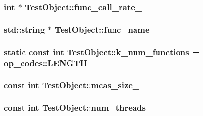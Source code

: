 \subsubsection[{func\+\_\+call\+\_\+rate\+\_\+}]{\setlength{\rightskip}{0pt plus 5cm}int $\ast$ Test\+Object\+::func\+\_\+call\+\_\+rate\+\_\+}\label{class_test_object_ad069dbfc17e738bda7f5ef0a976aab30}
\hypertarget{class_test_object_a0824981875a52434332860af996f4ffb}{}
\subsubsection[{func\+\_\+name\+\_\+}]{\setlength{\rightskip}{0pt plus 5cm}std\+::string $\ast$ Test\+Object\+::func\+\_\+name\+\_\+}\label{class_test_object_a0824981875a52434332860af996f4ffb}
\hypertarget{class_test_object_a2eafe110f35fcae7fa739cd52f02392a}{}
\subsubsection[{k\+\_\+num\+\_\+functions}]{\setlength{\rightskip}{0pt plus 5cm}static const int Test\+Object\+::k\+\_\+num\+\_\+functions = op\+\_\+codes\+::\+L\+E\+N\+G\+T\+H\hspace{0.3cm}{\ttfamily [static]}}\label{class_test_object_a2eafe110f35fcae7fa739cd52f02392a}
\hypertarget{class_test_object_aafa8d7cb90fc81d821f1788af2959ac6}{}
\subsubsection[{mcas\+\_\+size\+\_\+}]{\setlength{\rightskip}{0pt plus 5cm}const int Test\+Object\+::mcas\+\_\+size\+\_\+}\label{class_test_object_aafa8d7cb90fc81d821f1788af2959ac6}
\hypertarget{class_test_object_aad9fb886d54e6c7eeb9685d0d89854b0}{}
\subsubsection[{num\+\_\+threads\+\_\+}]{\setlength{\rightskip}{0pt plus 5cm}const int Test\+Object\+::num\+\_\+threads\+\_\+}\label{class_test_object_aad9fb886d54e6c7eeb9685d0d89854b0}
\hypertarget{class_test_object_a034546a627911670749ab574d92831b5}{}
